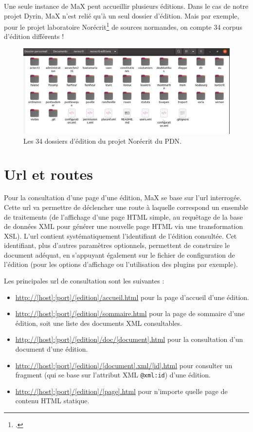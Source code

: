 \documentclass[a4paper,12pt,twoside]{book}
\begin{document}
Une seule instance de MaX peut accueillir plusieurs éditions. Dans le cas de notre projet Dyrin, MaX n'est relié qu'à un seul dossier d'édition. Mais par exemple, pour le projet laboratoire Norécrit\footcite{norecrit} de sources normandes, on compte 34 corpus d'édition différents !

\begin{figure}[H]
    \centering
    \includegraphics[width=12cm]{img/partie_2/norecrit.JPG}
    \caption{Les 34 dossiers d'édition du projet Norécrit du \acrshort{PDN}.}
\end{figure}

\section{Url et routes}
Pour la consultation d'une page d'une édition, MaX se base sur l'url interrogée. Cette url va permettre de déclencher une route à laquelle correspond un ensemble de traitements (de l'affichage d'une page \acrshort{HTML} simple, au requêtage de la base de données \acrshort{XML} pour générer une nouvelle page \acrshort{HTML} via une transformation \acrshort{XSL}). L'url contient systématiquement l'identifiant de l'édition consultée. Cet identifiant, plus d'autres paramètres optionnels, permettent de construire le document adéquat, en s'appuyant également sur le fichier de configuration de l'édition (pour les options d'affichage ou l'utilisation des plugins par exemple).

Les principales url de consultation sont les suivantes :

\begin{itemize}
    \item \url{http://[host]:[port]/[edition]/accueil.html} pour la page d'accueil d'une édition.
    \item \url{http://[host]:[port]/[edition]/sommaire.html} pour la page de sommaire d'une édition, soit une liste des documents XML consultables.
    \item \url{http://[host]:[port]/[edition]/doc/[document].html} pour la consultation d'un document d'une édition.
    \item \url{http://[host]:[port]/[edition]/[document].xml/[id].html} pour consulter un fragment (qui se base sur l'attribut XML \texttt{@xml:id}) d'une édition.
    \item \url{http://[host]:[port]/[edition]/[page].html} pour n'importe quelle page de contenu \acrshort{HTML} statique.
\end{itemize}
\end{document}
